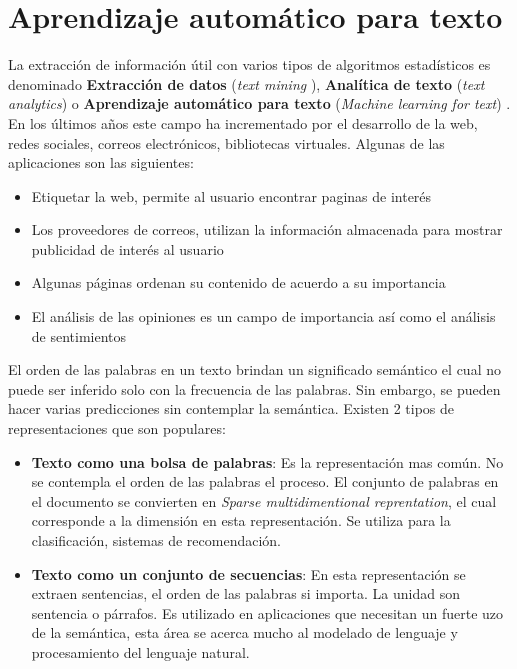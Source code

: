 
\section[AA Para texto]{Aprendizaje automático para texto}

La extracción de información útil con varios tipos de algoritmos estadísticos es denominado \textbf{Extracción de datos} (\textit{text mining} ), \textbf{Analítica de texto} (\textit{text analytics}) o \textbf{Aprendizaje automático para texto} (\textit{Machine learning for text}) \citep{CD1}. En los últimos años este campo ha incrementado por el desarrollo de la web, redes sociales, correos electrónicos, bibliotecas virtuales. Algunas de las aplicaciones son las siguientes:

\begin{itemize}

	\item Etiquetar la web, permite al usuario encontrar paginas de interés

	\item Los proveedores de correos, utilizan la información almacenada para mostrar publicidad de interés al usuario

	\item Algunas páginas ordenan su contenido de acuerdo a su importancia

	\item El análisis de las opiniones es un campo de importancia así como el análisis de sentimientos		

\end{itemize}

El orden de las palabras en un texto brindan un significado semántico el cual no puede ser inferido  solo con la frecuencia de las palabras. Sin embargo, se pueden hacer varias predicciones sin contemplar la semántica. Existen 2 tipos de representaciones que son populares:

\begin{itemize}
	
	\item \textbf{Texto como una bolsa de palabras}: Es la representación mas común. No se contempla el orden de las palabras el proceso. El conjunto de palabras en el documento se convierten en \textit{Sparse multidimentional reprentation}, el cual corresponde a la dimensión en esta representación. Se utiliza para la clasificación, sistemas de recomendación.

	\item \textbf{Texto como un conjunto de secuencias}: En esta representación se extraen sentencias, el orden de las palabras si importa. La unidad son sentencia o párrafos. Es utilizado en aplicaciones que necesitan un fuerte uzo de la semántica, esta área se acerca mucho al modelado de lenguaje y procesamiento del lenguaje natural.

\end{itemize}


